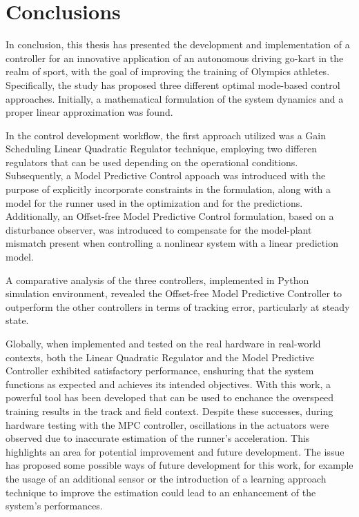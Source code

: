 \documentclass[a4paper,12pt,oneside]{book}
\begin{document}
\chapter*{Conclusions}

In conclusion, this thesis has presented the development and implementation of a controller for an innovative application of an autonomous driving go-kart in the realm of sport, with the goal of improving the training of Olympics athletes.
Specifically, the study has proposed three different optimal mode-based control approaches.
Initially, a mathematical formulation of the system dynamics and a proper linear approximation was found.

In the control development workflow, the first approach utilized was a Gain Scheduling Linear Quadratic Regulator technique, employing two differen regulators that can be used depending on the operational conditions.
Subsequently, a Model Predictive Control appoach was introduced with the purpose of explicitly incorporate constraints in the formulation, along with a model for the runner used in the optimization and for the predictions.
Additionally, an Offset-free Model Predictive Control formulation, based on a disturbance observer, was introduced to compensate for the model-plant mismatch present when controlling a nonlinear system with a linear prediction model.

A comparative analysis of the three controllers, implemented in Python simulation environment, revealed the Offset-free Model Predictive Controller to outperform the other controllers in terms of tracking error, particularly at steady state.

Globally, when implemented and tested on the real hardware in real-world contexts, both the Linear Quadratic Regulator and the Model Predictive Controller exhibited satisfactory performance, enshuring that the system functions as expected and achieves its intended objectives.
With this work, a powerful tool has been developed that can be used to enchance the overspeed training results in the track and field context.
Despite these successes, during hardware testing with the MPC controller, oscillations in the actuators were observed due to inaccurate estimation of the runner's acceleration. 
This highlights an area for potential improvement and future development.
The issue has proposed some possible ways of future development for this work, for example the usage of an additional sensor or the introduction of a learning approach technique to improve the estimation could lead to an enhancement of the system's performances.


	





\printbibliography



\newpage
\end{document}
